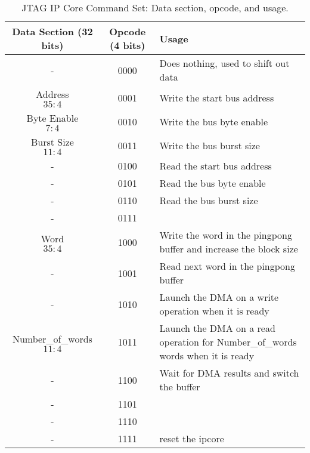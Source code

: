 \documentclass[a4paper,11pt,oneside]{report}
\begin{document}
\begin{table}[h!]
    \centering
    \begin{tabular}{|c|c|l|}
        \hline
        \textbf{Data Section (32 bits)} & \textbf{Opcode (4 bits)} & \textbf{Usage} \\
        \hline
        -                               & 0000                     & Does nothing, used to shift out data \\
        Address \[35:4\]                & 0001                     & Write the start bus address \\
        Byte Enable \[7:4\]             & 0010                     & Write the bus byte enable \\
        Burst Size \[11:4\]             & 0011                     & Write the bus burst size \\
        -                               & 0100                     & Read the start bus address \\
        -                               & 0101                     & Read the bus byte enable \\
        -                               & 0110                     & Read the bus burst size \\
        -                               & 0111                     &  \\
        Word \[35:4\]                   & 1000                     &  Write the word in the pingpong buffer and increase the block size\\
        -                               & 1001                     &  Read next word in the pingpong buffer\\
        -                               & 1010                     &  Launch the DMA on a write operation when it is ready\\
        Number_of_words \[11:4\]        & 1011                     &  Launch the DMA on a read operation for Number_of_words words when it is ready\\
        -                               & 1100                     &  Wait for DMA results and switch the buffer\\
        -                               & 1101                     & \\
        -                               & 1110                     & \\
        -                               & 1111                     &  reset the ipcore\\
        \hline
    \end{tabular}
    \caption{JTAG IP Core Command Set: Data section, opcode, and usage.}
    \label{tab:jtag_commands}
\end{table}
\end{document}
